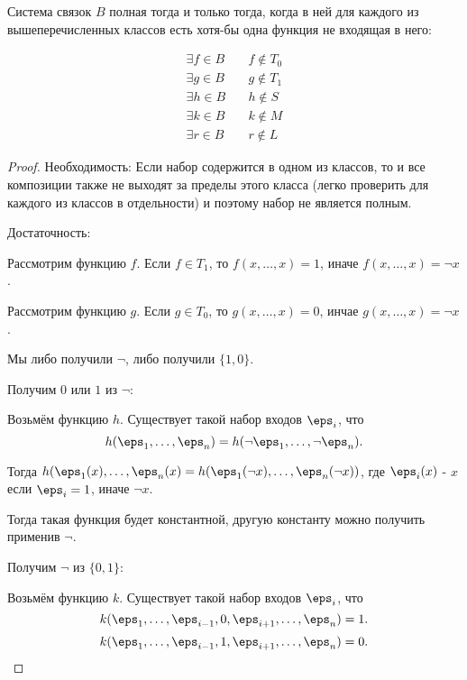 \begin{theorem} \thmslashn

    Система связок $B$ полная тогда и только тогда, когда в ней для каждого из вышеперечисленных классов есть хотя-бы одна функция не входящая в него:
    
    \begin{equation*}
        \begin{split}
            \exists{f\in B}\quad& f \not\in T_0\\
            \exists{g\in B}\quad& g \not\in T_1\\
            \exists{h\in B}\quad& h \not\in S\\
            \exists{k\in B}\quad& k \not\in M\\
            \exists{r\in B}\quad& r \not\in L
        \end{split}
    \end{equation*}
    \begin{proof} \thmslashn
        
        Необходимость: Если набор содержится в одном из классов, то и все композиции также не выходят за пределы этого класса (легко проверить для каждого из классов в отдельности) и поэтому набор не является полным.
    
        Достаточность:

        Рассмотрим функцию $f$. Если $f\in T_1$, то $f(x, \ldots, x) = 1$, иначе $f(x, \ldots, x) = \neg x$.

        Рассмотрим функцию $g$. Если $g\in T_0$, то $g(x, \ldots, x) = 0$, инчае $g(x, \ldots, x) = \neg x$.

        Мы либо получили $\neg$, либо получили $\{1, 0\}$.

        Получим $0$ или $1$ из $\neg$:

        Возьмём функцию $h$. Существует такой набор входов $\eps_{i}$, что
        \[ h(\eps_1, \ldots, \eps_{n}) = h(\neg \eps_1, \ldots, \neg \eps_{n}) .\]

        Тогда $h(\eps_1(x), \ldots, \eps_{n}(x) = h(\eps_1(\neg x), \ldots, \eps_{n}(\neg x))$, где $\eps_{i}(x)$ - $x$ если $\eps_{i} = 1$, иначе $\neg x$.

        Тогда такая функция будет константной, другую константу можно получить применив $\neg$.

        Получим $\neg$ из $\{0, 1\} $:

        Возьмём функцию $k$. Существует такой набор входов $\eps_{i}$, что
        \[ k(\eps_1, \ldots, \eps_{i-1}, 0, \eps_{i+1}, \ldots, \eps_{n}) = 1 .\] 
        \[ k(\eps_1, \ldots, \eps_{i-1}, 1, \eps_{i+1}, \ldots, \eps_{n}) = 0 .\]


\end{proof}
\end{theorem}
